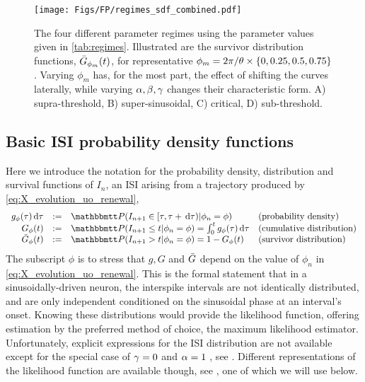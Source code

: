\begin{figure}[ht]    
\begin{center} 
\texttt{[image: Figs/FP/regimes\_sdf\_combined.pdf]}
\caption[Model Regimes hitting-time survivor distributions]{The four different
parameter regimes using the parameter values given in \cref{tab:regimes}. Illustrated are the survivor
distribution functions, ${ \bar{G} }_{\phi_m}(t)$, for representative $\phi_m = 2\pi/{ \theta}
\times \{0,0.25,0.5,0.75\}$. Varying $\phi_m$ has, for the most part, the effect
of shifting the curves laterally, while varying ${\alpha,\beta,{\gamma } }$ changes their
characteristic form.
A) supra-threshold, B) super-sinusoidal, C) critical, D) sub-threshold.}
\label{fig:4regimes_illustrated_SDF}    
\end{center}
\end{figure}     

\clearpage

\subsection{Basic ISI probability density functions}
Here we introduce the notation for the  probability density, distribution and
survival functions of $I_n$, an ISI arising from a trajectory
produced by \cref{eq:X_evolution_uo_renewal},
\begin{equation} 
\begin{array}{rcll}
g_{\phi}(\t) \intd{\t} &:=& \Prob(I_{n+1} \in [\t, \t + \intd{\t})  | \phi_n =
\phi) &
 \textrm{(probability density)} 
\\ 
G_{\phi}(t) &:=& \Prob(I_{n+1} \leq t  |\phi_n = \phi ) = \int_0^t g_{\phi}(\t)
\intd{\t} &
 \textrm{(cumulative distribution)}
\\
\G_{\phi}(t) &:= & \Prob(I_{n+1}>t | \phi_n = \phi ) = 1 - G_{\phi}(t)
&
 \textrm{(survivor distribution)}
\end{array}
\label{eq:ISI_distribution_functions_sinspike} 
\end{equation}
The subscript $\phi$ is to stress that $g, G$ and ${ \bar{G} }$ depend on the value of
$\phi_n$ in \cref{eq:X_evolution_uo_renewal}. This is the formal statement that
in a sinusoidally-driven neuron, the interspike intervals are not identically
distributed, and are only independent conditioned on the sinusoidal phase at an
interval's onset. Knowing these distributions would provide the likelihood function,
offering estimation by the preferred method of choice, the maximum likelihood
estimator. Unfortunately, explicit expressions for the ISI distribution are not
available except for the special case of ${\gamma } = 0$ and $\alpha=1$ , see
\cite{DitlevsenLansky2005}. Different representations of the likelihood function
are available though, see \cite{Alili2005}, one of which we will use below.

